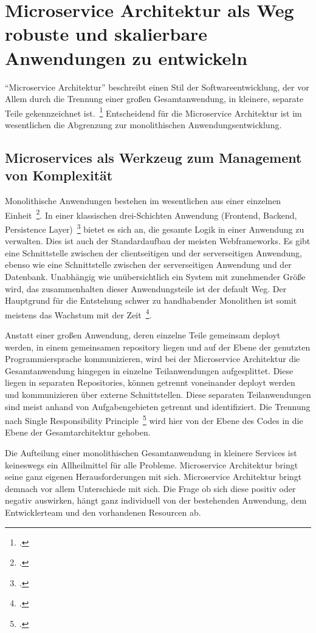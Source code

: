 \chapter{Microservice Architektur als Weg robuste und skalierbare Anwendungen zu entwickeln}
``Microservice Architektur'' beschreibt einen Stil der Softwareentwicklung, der vor Allem durch die Trennung einer großen Gesamtanwendung, in kleinere, separate Teile gekennzeichnet ist.~\footcite[vgl.][Seite 2]{newman2015building}
Entscheidend für die Microservice Architektur ist im wesentlichen die Abgrenzung zur monolithischen Anwendungsentwicklung.

\section{Microservices als Werkzeug zum Management von Komplexität}
Monolithische Anwendungen bestehen im wesentlichen aus einer einzelnen Einheit~\footcite[vgl.][]{Fowler:Intro}. In einer klassischen drei-Schichten Anwendung (Frontend, Backend, Persistence Layer)~\footcite[vgl.][]{MSDN:TTA} bietet es sich an, die gesamte Logik in einer Anwendung zu verwalten. Dies ist auch der Standardaufbau der meisten Webframeworks. Es gibt eine Schnittstelle zwischen der clientseitigen und der serverseitigen Anwendung, ebenso wie eine Schnittstelle zwischen der serverseitigen Anwendung und der Datenbank. Unabhängig wie unübersichtlich ein System mit zunehmender Größe wird, das zusammenhalten dieser Anwendungsteile ist der default Weg. Der Hauptgrund für die Entstehung schwer zu handhabender Monolithen ist somit meistens das Wachstum mit der Zeit~\footcite[vgl.][]{infaktuell}.

Anstatt einer großen Anwendung, deren einzelne Teile gemeinsam deployt werden, in einem gemeinsamen repository liegen und auf der Ebene der genutzten Programmiersprache kommunizieren, wird bei der Microservice Architektur die Gesamtanwendung hingegen in einzelne Teilanwendungen aufgesplittet. Diese liegen in separaten Repositories, können getrennt voneinander deployt werden und kommunizieren über externe Schnittstellen. Diese separaten Teilanwendungen sind meist anhand von Aufgabengebieten getrennt und identifiziert. Die Trennung nach Single Responsibility Principle~\footcite[vgl.][Seite 108]{Martin:SRP} wird hier von der Ebene des Codes in die Ebene der Gesamtarchitektur gehoben.

Die Aufteilung einer monolithischen Gesamtanwendung in kleinere Services ist keineswegs ein Allheilmittel für alle Probleme. Microservice Architektur bringt seine ganz eigenen Herausforderungen mit sich. Microservice Architektur bringt demnach vor allem Unterschiede mit sich. Die Frage ob sich diese positiv oder negativ auswirken, hängt ganz individuell von der bestehenden Anwendung, dem Entwicklerteam und den vorhandenen Resourcen ab.

